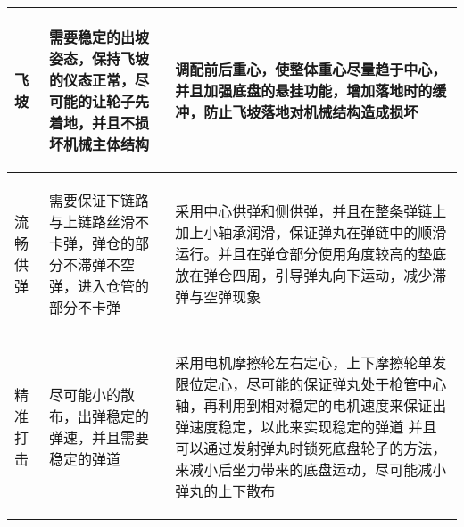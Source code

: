 \begin{longtable}{ p{2cm} | p{7.8cm} | p{6cm} |}
    \hline
    
        \begin{center}
            飞坡 
        \end{center} \cellcolor{gndcolor} &
        \begin{center}
            需要稳定的出坡姿态，保持飞坡的仪态正常，尽可能的让轮子先着地，并且不损坏机械主体结构
        \end{center} \cellcolor{gndcolor} &
        \begin{center}
            调配前后重心，使整体重心尽量趋于中心，并且加强底盘的悬挂功能，增加落地时的缓冲，防止飞坡落地对机械结构造成损坏
        \end{center} \cellcolor{gndcolor} \\

    \hline
    
        \begin{center}
            流畅供弹
        \end{center} &
        \begin{center}
            需要保证下链路与上链路丝滑不卡弹，弹仓的部分不滞弹不空弹，进入仓管的部分不卡弹
        \end{center} &
        \begin{center}
            采用中心供弹和侧供弹，并且在整条弹链上加上小轴承润滑，保证弹丸在弹链中的顺滑运行。并且在弹仓部分使用角度较高的垫底放在弹仓四周，引导弹丸向下运动，减少滞弹与空弹现象
        \end{center} \\
        
    \hline
    
        \begin{center}
            精准打击
        \end{center} &
        \begin{center}
            尽可能小的散布，出弹稳定的弹速，并且需要稳定的弹道
        \end{center} &
        \begin{center}
            采用电机摩擦轮左右定心，上下摩擦轮单发限位定心，尽可能的保证弹丸处于枪管中心轴，再利用到相对稳定的电机速度来保证出弹速度稳定，以此来实现稳定的弹道
            \newline 并且可以通过发射弹丸时锁死底盘轮子的方法，来减小后坐力带来的底盘运动，尽可能减小弹丸的上下散布
        \end{center} \\

    \hline
    

\end{longtable}
